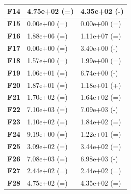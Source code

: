 \documentclass[12pt,a4paper]{report}
\begin{document}
{{{{{{{\begin{table}[h]
\begin{tabular}{|l|l|l|}
{\bf F14} & 4.75e+02 (=)        & 4.35e+02 (-) \\ \hline
{\bf F15} & 0.00e+00 (=)        & 0.00e+00 (=) \\ \hline
{\bf F16} & 1.88e+06 (=)        & 1.11e+07 (=) \\ \hline
{\bf F17} & 0.00e+00 (=)        & 3.40e+00 (-) \\ \hline
{\bf F18} & 1.57e+00 (=)        & 1.99e+00 (=) \\ \hline
{\bf F19} & 1.06e+01 (=)        & 6.74e+00 (-) \\ \hline
{\bf F20} & 1.87e+01 (=)        & 1.18e+01 (+) \\ \hline
{\bf F21} & 1.70e+02 (=)        & 1.64e+02 (=) \\ \hline
{\bf F22} & 7.10e+03 (=)        & 7.09e+03 (-) \\ \hline
{\bf F23} & 1.10e+02 (=)        & 1.84e+02 (=) \\ \hline
{\bf F24} & 9.19e+00 (=)        & 1.22e+01 (=) \\ \hline
{\bf F25} & 3.09e+02 (=)        & 3.44e+02 (=) \\ \hline
{\bf F26} & 7.08e+03 (=)        & 6.98e+03 (-) \\ \hline
{\bf F27} & 2.44e+02 (=)        & 2.44e+02 (=) \\ \hline
{\bf F28} & 4.75e+02 (=)        & 4.35e+02 (=) \\ \hline
\end{tabular}
\end{table}

}}}}}}}
\end{document}
